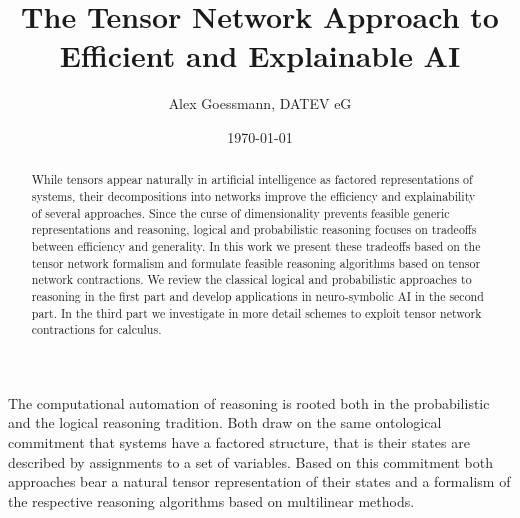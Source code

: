\documentclass[aps,onecolumn,nofootinbib,pra]{article}
\begin{document}
    \title{The Tensor Network Approach to Efficient and Explainable AI}
    \author{Alex Goessmann, DATEV eG}

    \maketitle
    \date{\today}

    \begin{abstract}
        While tensors appear naturally in artificial intelligence as factored representations of systems, their decompositions into networks improve the efficiency and explainability of several approaches.
        Since the curse of dimensionality prevents feasible generic representations and reasoning, logical and probabilistic reasoning focuses on tradeoffs between efficiency and generality.
        In this work we present these tradeoffs based on the tensor network formalism and formulate feasible reasoning algorithms based on tensor network contractions.
        We review the classical logical and probabilistic approaches to reasoning in the first part and develop applications in neuro-symbolic AI in the second part.
        In the third part we investigate in more detail schemes to exploit tensor network contractions for calculus.
    \end{abstract}

    \tableofcontents

    
    

    \part{\partonetext}\label{par:one}

    The computational automation of reasoning is rooted both in the probabilistic and the logical reasoning tradition.
    Both draw on the same ontological commitment that systems have a factored structure, that is their states are described by assignments to a set of variables.
    Based on this commitment both approaches bear a natural tensor representation of their states and a formalism of the respective reasoning algorithms based on multilinear methods.

    
    

    
    

    \part{\parttwotext}\label{par:two}
\end{document}
